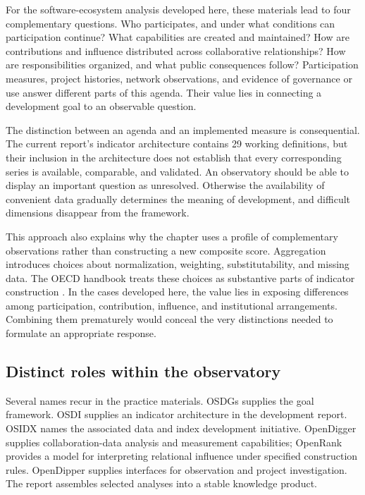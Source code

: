 For the software-ecosystem analysis developed here, these materials lead to four complementary questions. Who participates, and under what conditions can participation continue? What capabilities are created and maintained? How are contributions and influence distributed across collaborative relationships? How are responsibilities organized, and what public consequences follow? Participation measures, project histories, network observations, and evidence of governance or use answer different parts of this agenda. Their value lies in connecting a development goal to an observable question.

The distinction between an agenda and an implemented measure is consequential. The current report's indicator architecture contains 29 working definitions, but their inclusion in the architecture does not establish that every corresponding series is available, comparable, and validated. An observatory should be able to display an important question as unresolved. Otherwise the availability of convenient data gradually determines the meaning of development, and difficult dimensions disappear from the framework.

This approach also explains why the chapter uses a profile of complementary observations rather than constructing a new composite score. Aggregation introduces choices about normalization, weighting, substitutability, and missing data. The OECD handbook treats these choices as substantive parts of indicator construction \citep{oecd2008}. In the cases developed here, the value lies in exposing differences among participation, contribution, influence, and institutional arrangements. Combining them prematurely would conceal the very distinctions needed to formulate an appropriate response.

\subsection{Distinct roles within the observatory}
Several names recur in the practice materials. OSDGs supplies the goal framework. OSDI supplies an indicator architecture in the development report. OSIDX names the associated data and index development initiative. OpenDigger supplies collaboration-data analysis and measurement capabilities; OpenRank provides a model for interpreting relational influence under specified construction rules. OpenDipper supplies interfaces for observation and project investigation. The report assembles selected analyses into a stable knowledge product.

